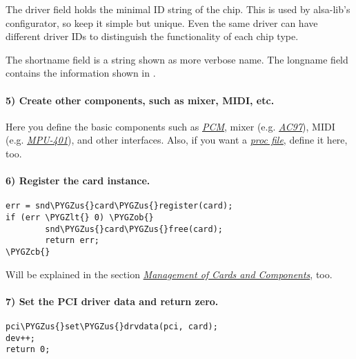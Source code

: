 \documentclass[a4paper,8pt,english]{sphinxmanual}
\def\PYGZus{\char`\_}
\def\PYGZob{\char`\{}
\def\PYGZcb{\char`\}}
\def\PYGZlt{\char`\<}
\begin{document}
The driver field holds the minimal ID string of the chip. This is used
by alsa-lib's configurator, so keep it simple but unique. Even the
same driver can have different driver IDs to distinguish the
functionality of each chip type.

The shortname field is a string shown as more verbose name. The longname
field contains the information shown in .


\paragraph{5) Create other components, such as mixer, MIDI, etc.}
\label{sound/kernel-api/writing-an-alsa-driver:create-other-components-such-as-mixer-midi-etc}
Here you define the basic components such as {\hyperref[sound/kernel\string-api/writing\string-an\string-alsa\string-driver:PCM\string-Interface]{\emph{PCM}}},
mixer (e.g. {\hyperref[sound/kernel\string-api/writing\string-an\string-alsa\string-driver:API\string-for\string-AC97\string-Codec]{\emph{AC97}}}), MIDI (e.g.
{\hyperref[sound/kernel\string-api/writing\string-an\string-alsa\string-driver:MIDI\string-MPU401\string-UART\string-Interface]{\emph{MPU-401}}}), and other interfaces.
Also, if you want a {\hyperref[sound/kernel\string-api/writing\string-an\string-alsa\string-driver:Proc\string-Interface]{\emph{proc file}}}, define it here,
too.


\paragraph{6) Register the card instance.}
\label{sound/kernel-api/writing-an-alsa-driver:register-the-card-instance}
\begin{Verbatim}[commandchars=\\\{\}]
err = snd\PYGZus{}card\PYGZus{}register(card);
if (err \PYGZlt{} 0) \PYGZob{}
        snd\PYGZus{}card\PYGZus{}free(card);
        return err;
\PYGZcb{}
\end{Verbatim}

Will be explained in the section {\hyperref[sound/kernel\string-api/writing\string-an\string-alsa\string-driver:management\string-of\string-cards\string-and\string-components]{\emph{Management of Cards and
Components}}}, too.


\paragraph{7) Set the PCI driver data and return zero.}
\label{sound/kernel-api/writing-an-alsa-driver:set-the-pci-driver-data-and-return-zero}
\begin{Verbatim}[commandchars=\\\{\}]
pci\PYGZus{}set\PYGZus{}drvdata(pci, card);
dev++;
return 0;
\end{Verbatim}
\end{document}
